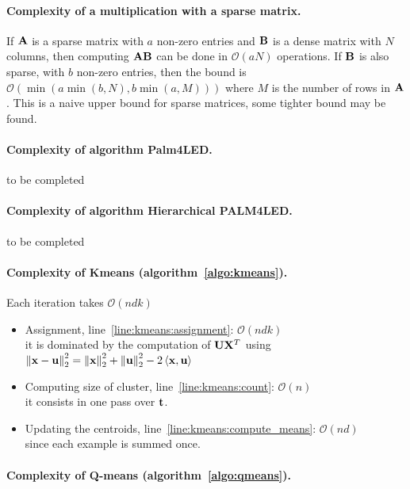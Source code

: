 \paragraph{Complexity of a multiplication with a sparse matrix.}
If ${\mathbf{A}}$ is a sparse matrix with $a$ non-zero entries and ${\mathbf{B}}$ is a dense matrix with $N$ columns, then computing ${\mathbf{A}} {\mathbf{B}}$ can be done in $\mathcal{O}\left (aN\right )$ operations.
If ${\mathbf{B}}$ is also sparse, with $b$ non-zero entries, then the bound is $\mathcal{O}\left ( \min\left ( a \min\left (b, N \right ), b \min\left (a, M\right ) \right ) \right )$ where $M$ is the number of rows in ${\mathbf{A}}$.
This is a naive upper bound for sparse matrices, some tighter bound may be found.

\paragraph{Complexity of algorithm Palm4LED.}
to be completed

\paragraph{Complexity of algorithm Hierarchical PALM4LED.}
to be completed

\paragraph{Complexity of Kmeans (algorithm~\ref{algo:kmeans}).}
Each iteration takes $\mathcal{O}\left (ndk\right )$
\begin{itemize}
\item Assignment, line~\ref{line:kmeans:assignment}: $\mathcal{O}\left (ndk\right )$\\
it is dominated by the computation of ${\mathbf{U}} {\mathbf{X}}^T$ using $\left \|{\mathbf{x}}-{\mathbf{u}}\right \|_2^2=\left \|{\mathbf{x}}\right \|_2^2+\left \|{\mathbf{u}}\right \|_2^2-2\left <{\mathbf{x}}, {\mathbf{u}}\right >$
\item Computing size of cluster, line~\ref{line:kmeans:count}: $\mathcal{O}\left (n \right )$\\
it consists in one pass over ${\mathbf{t}}$.
\item Updating the centroids, line~\ref{line:kmeans:compute_means}: $\mathcal{O}\left (nd\right )$\\
since each example is summed once.
\end{itemize}

\paragraph{Complexity of Q-means (algorithm~\ref{algo:qmeans}).}
